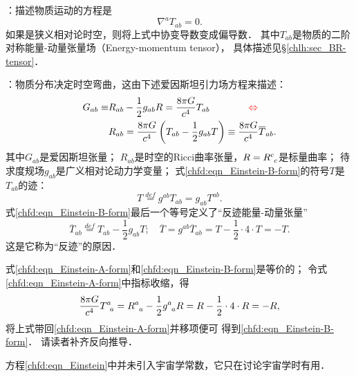 \noindent{}：描述物质运动的方程是
\begin{equation}\label{chfd:eqn_motion-gr}
    \nabla^a T_{ab} =0.
\end{equation}
如果是狭义相对论时空，则将上式中协变导数变成偏导数．
其中$T_{ab}$是物质的二阶对称能量-动量张量场（Energy-momentum tensor），
具体描述见\S\ref{chlh:sec_BR-tensor}．



\noindent{}：物质分布决定时空弯曲，这由下述爱因斯坦引力场方程来描述：
\begin{subequations}\label{chfd:eqn_Einstein}
	\begin{align}
		G_{ab} \equiv & R_{ab} - \frac{1}{2}g_{ab} R = \frac{8\pi G}{c^4} T_{ab}
		\label{chfd:eqn_Einstein-A-form} {\qquad \qquad \color{red} \Leftrightarrow} \\
		& R_{ab} = \frac{8\pi G}{c^4} \left(T_{ab} - \frac{1}{2}g_{ab}T \right)
        \equiv \frac{8\pi G}{c^4} \overline{T}_{ab}. \label{chfd:eqn_Einstein-B-form}
	\end{align}
\end{subequations}
其中$G_{ab}$是爱因斯坦张量；
$R_{ab}$是时空的Ricci曲率张量，$R=R^c_{\hphantom{c} c}$是标量曲率；
待求度规场$g_{ab}$是广义相对论动力学变量；
式\eqref{chfd:eqn_Einstein-B-form}的符号$T$是${T}_{ab}$的迹：
\begin{equation}
    T \overset{def}{=} g^{ab}T_{ab} = g_{ab}T^{ab} .
\end{equation}
式\eqref{chfd:eqn_Einstein-B-form}最后一个等号定义了“反迹能量-动量张量”
\begin{equation}
    \overline{T}_{ab}\overset{def}{=}T_{ab} - \frac{1}{2}g_{ab}T ;\quad
    \overline{T} = g^{ab}\overline{T}_{ab} %
      = T-\frac{1}{2}\cdot 4\cdot T = -T .
\end{equation}
这是它称为“反迹”的原因．


式\eqref{chfd:eqn_Einstein-A-form}和\eqref{chfd:eqn_Einstein-B-form}是等价的；
令式\eqref{chfd:eqn_Einstein-A-form}中指标收缩，得
\begin{equation}\label{chfd:eqn_R-and-T}
	\frac{8\pi G}{c^4} T^{a}_{\hphantom{a} a} 
    = R^{a}_{\hphantom{a} a} -  \frac{1}{2}g^{a}_{\hphantom{a} a} R
	=R - \frac{1}{2}\cdot 4 \cdot R =-R,
\end{equation}
将上式带回\eqref{chfd:eqn_Einstein-A-form}并移项便可
得到\eqref{chfd:eqn_Einstein-B-form}．
请读者补齐反向推导．

方程\eqref{chfd:eqn_Einstein}中并未引入宇宙学常数，它只在讨论宇宙学时有用．

